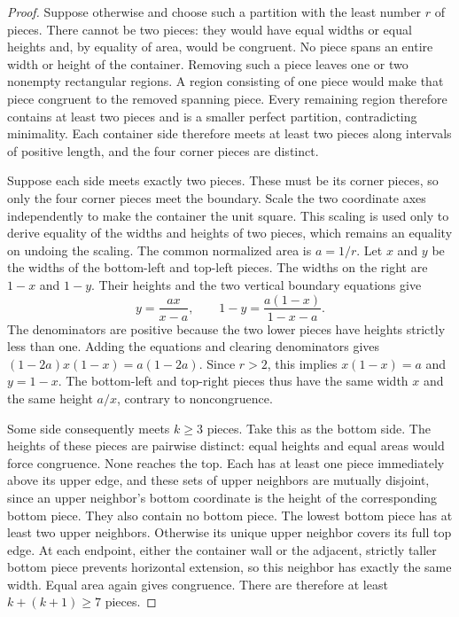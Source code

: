 \documentclass[11pt]{article}
\begin{document}
\begin{proof}
Suppose otherwise and choose such a partition with the least number $r$ of pieces.
There cannot be two pieces: they would have equal widths or equal heights and,
by equality of area, would be congruent. No piece spans an entire width or height
of the container. Removing such a piece leaves one or two nonempty rectangular
regions. A region consisting of one piece would make that piece congruent to
the removed spanning piece. Every remaining region therefore contains at least
two pieces and is a smaller perfect partition, contradicting minimality. Each container side
therefore meets at least two pieces along intervals of positive length, and the
four corner pieces are distinct.

Suppose each side meets exactly two pieces. These must be its corner pieces, so
only the four corner pieces meet the boundary. Scale the two coordinate axes
independently to make the container the unit square. This scaling is used only
to derive equality of the widths and heights of two pieces, which remains an
equality on undoing the scaling. The common normalized area is $a=1/r$. Let $x$
and $y$ be the widths of the bottom-left and top-left pieces. The widths on the
right are $1-x$ and $1-y$. Their heights and the two vertical boundary equations
give
\[
 y=\frac{ax}{x-a},\qquad 1-y=\frac{a(1-x)}{1-x-a}.
\]
The denominators are positive because the two lower pieces have heights strictly
less than one. Adding the equations and clearing denominators gives
$(1-2a)x(1-x)=a(1-2a)$. Since $r>2$, this implies $x(1-x)=a$ and $y=1-x$.
The bottom-left and top-right pieces thus have the same width $x$ and the same
height $a/x$, contrary to noncongruence.

Some side consequently meets $k\ge3$ pieces. Take this as the bottom side.
The heights of these pieces are pairwise distinct: equal heights and equal
areas would force congruence. None reaches the top. Each has at least one piece
immediately above its upper edge, and these sets of upper neighbors are mutually
disjoint, since an upper neighbor's bottom coordinate is the height of the
corresponding bottom piece. They also contain no bottom piece. The lowest
bottom piece has at least two upper neighbors. Otherwise its unique upper
neighbor covers its full top edge. At each endpoint, either the container wall
or the adjacent, strictly taller bottom piece prevents horizontal extension,
so this neighbor has exactly the same width. Equal area again gives congruence.
There are therefore at least $k+(k+1)\ge7$ pieces.
\end{proof}
\end{document}
